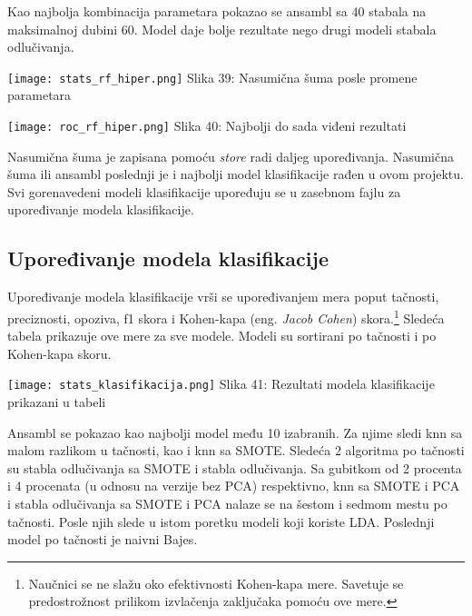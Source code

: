 \documentclass[a4paper]{article}
\begin{document}
{Kao najbolja kombinacija parametara pokazao se ansambl sa 40 stabala na maksimalnoj dubini 60. Model daje bolje rezultate nego drugi modeli stabala odlučivanja.

\noindent\begin{minipage}{0.4\textwidth}
\texttt{[image: stats\_rf\_hiper.png]}
Slika 39: Nasumična šuma posle promene parametara\\
\end{minipage}
\begin{minipage}{0.6\textwidth}
\texttt{[image: roc\_rf\_hiper.png]}
\hphantom{aa}Slika 40: Najbolji do sada viđeni rezultati\\
\end{minipage}

Nasumična šuma je zapisana pomoću {\em store} radi daljeg upoređivanja. Nasumična šuma ili ansambl poslednji je i najbolji model klasifikacije rađen u ovom projektu. Svi gorenavedeni modeli klasifikacije  upoređuju se u zasebnom fajlu za upoređivanje modela klasifikacije.

\subsection{Upoređivanje modela klasifikacije}
\label{upoređivanje_modela_klasifikacije}

Upoređivanje modela klasifikacije vrši se upoređivanjem mera poput tačnosti, preciznosti, opoziva, f1 skora i Kohen-kapa (eng. {\em Jacob Cohen}) skora.\footnote[5]{Naučnici se ne slažu oko efektivnosti Kohen-kapa mere. Savetuje se predostrožnost prilikom izvlačenja zaključaka pomoću ove mere.} Sledeća tabela prikazuje ove mere za sve modele. Modeli su sortirani po tačnosti i po Kohen-kapa skoru.\\

\noindent\begin{minipage}{1.0\textwidth}
\texttt{[image: stats\_klasifikacija.png]}
\hphantom{aaaaaaaaaaaaa}Slika 41: Rezultati modela klasifikacije prikazani u tabeli\\
\end{minipage}

Ansambl se pokazao kao najbolji model među 10 izabranih. Za njime sledi knn sa malom razlikom u tačnosti, kao i knn sa SMOTE. Sledeća 2 algoritma po tačnosti su stabla odlučivanja sa SMOTE i stabla odlučivanja. Sa gubitkom od 2 procenta i 4 procenata (u odnosu na verzije bez PCA) respektivno, knn sa SMOTE i PCA i stabla odlučivanja sa SMOTE i PCA nalaze se na šestom i sedmom mestu po tačnosti. Posle njih slede u istom poretku modeli koji koriste LDA. Poslednji model po tačnosti je naivni Bajes.\\

}
\end{document}
